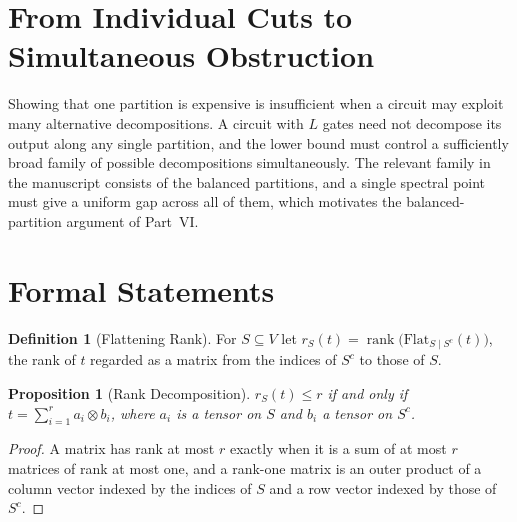 \documentclass[11pt,letterpaper]{report}
\theoremstyle{plain}
\newtheorem{proposition}[theorem]{Proposition}
\theoremstyle{definition}
\newtheorem{definition}[theorem]{Definition}
\theoremstyle{remark}
\begin{document}
\section{From Individual Cuts to Simultaneous Obstruction}

Showing that one partition is expensive is insufficient when a circuit may exploit many alternative decompositions. A circuit with $L$ gates need not decompose its output along any single partition, and the lower bound must control a sufficiently broad family of possible decompositions simultaneously. The relevant family in the manuscript consists of the balanced partitions, and a single spectral point must give a uniform gap across all of them, which motivates the balanced-partition argument of Part~VI.

\section{Formal Statements}

\begin{definition}[Flattening Rank]
For $S\subseteq V$ let $r_S(t)=\operatorname{rank}\bigl(\mathrm{Flat}_{S\mid S^c}(t)\bigr)$, the rank of $t$ regarded as a matrix from the indices of $S^c$ to those of $S$.
\end{definition}

\begin{proposition}[Rank Decomposition]
$r_S(t)\le r$ if and only if $t=\sum_{i=1}^{r}a_i\otimes b_i$, where $a_i$ is a tensor on $S$ and $b_i$ a tensor on $S^c$.
\end{proposition}
\begin{proof}
A matrix has rank at most $r$ exactly when it is a sum of at most $r$ matrices of rank at most one, and a rank-one matrix is an outer product of a column vector indexed by the indices of $S$ and a row vector indexed by those of $S^c$.
\end{proof}
\end{document}
